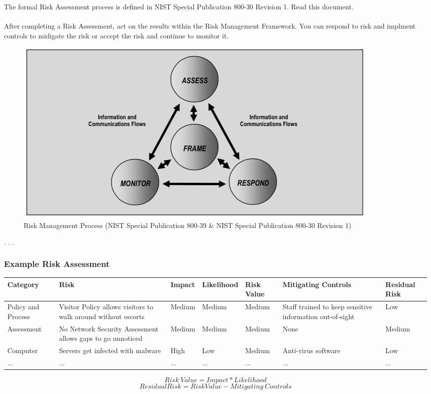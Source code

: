 The formal Risk Assessment process is defined in NIST Special Publication 800-30 Revision 1. Read this document.\\\\
After completing a Risk Assessment, act on the results within the Risk Management Framework. You can respond to  risk and implment controls to midigate the risk or accept the risk and continue to monitor it.
\begin{figure}[h]
\centering\includegraphics[scale=.55]{./img/RiskManagementProcess}
\caption{Risk Management Process (NIST Special Publication 800-39 \& NIST Special Publication 800-30 Revision 1)}
\end{figure}
\newpage
.
\newpage
.
\newpage
.
\subsubsection{Example Risk Assessment}
\begin{table}[h]\begin{center}\begin{tabular}{|p{1.9cm}|p{2.8cm}|p{1.3cm}|p{1.7cm}|p{1.3cm}|p{2.8cm}|p{1.4cm}|}\hline
Category & Risk & Impact & Likelihood & Risk Value & Mitigating Controls & Residual Risk\\\hline
Policy and Process & Visitor Policy allows visitors to walk around without escorts & Medium & Medium & Medium & Staff trained to keep sensitive information out-of-sight & Low\\\hline
Assessment & No Network Security Assessment allows gaps to go unnoticed & Medium & Medium & Medium & None & Medium\\\hline
Computer & Servers get infected with malware & High & Low & Medium & Anti-virus software & Low\\\hline
... & ... & ... & ... & ... & ... & ... \\\hline
\end{tabular}\end{center}\end{table}
\begin{equation}Risk\ Value = Impact * Likelihood\end{equation}
\begin{equation}Residual Risk = Risk Value - Mitigating\ Controls\end{equation}
